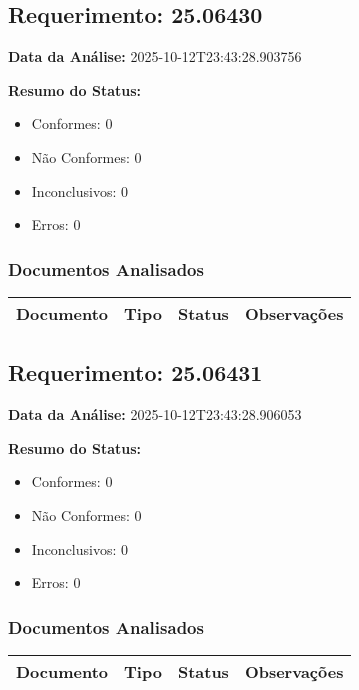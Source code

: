 \documentclass[12pt,a4paper]{article}
\begin{document}
\subsection{Requerimento: 25.06430}

\textbf{Data da Análise:} 2025-10-12T23:43:28.903756

\textbf{Resumo do Status:}
\begin{itemize}
    \item Conformes: 0
    \item Não Conformes: 0
    \item Inconclusivos: 0
    \item Erros: 0
\end{itemize}

\subsubsection{Documentos Analisados}

\begin{longtable}{|p{4cm}|p{2cm}|p{2cm}|p{6cm}|}
\hline
\textbf{Documento} & \textbf{Tipo} & \textbf{Status} & \textbf{Observações} \\
\hline
\endhead
\end{longtable}


\subsection{Requerimento: 25.06431}

\textbf{Data da Análise:} 2025-10-12T23:43:28.906053

\textbf{Resumo do Status:}
\begin{itemize}
    \item Conformes: 0
    \item Não Conformes: 0
    \item Inconclusivos: 0
    \item Erros: 0
\end{itemize}

\subsubsection{Documentos Analisados}

\begin{longtable}{|p{4cm}|p{2cm}|p{2cm}|p{6cm}|}
\hline
\textbf{Documento} & \textbf{Tipo} & \textbf{Status} & \textbf{Observações} \\
\hline
\endhead
\end{longtable}
\end{document}

